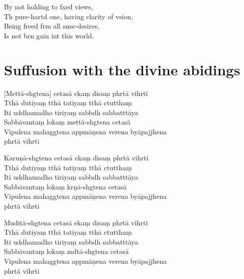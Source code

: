 By not holding to fxed views,\\
Th pure-hartd one, having clarity of vsion,\\
Being freed frm all snse-desires,\\
Is not brn gain int this world.

\clearpage

\chapter[Divine abidings]{Suffusion with the divine abidings}                                          %

\begin{leader}
\end{leader}

[Mettā-shgtena] cetasā ekaṃ disaṃ phrtā vihrti\\
Tthā dutiyaṃ tthā tatiyaṃ tthā ctutthaṃ\\
Iti uddhamadho tiriyaṃ sabbdh sabbatttāya\\
Sabbāvantaṃ lokaṃ mettā-shgtena cetasā\\
Vipulena mahaggtena appmāṇena verena byāpajjhena\\
\vin phrtā vihrti

Karuṇā-shgtena cetasā ekaṃ disaṃ phrtā vihrti\\
Tthā dutiyaṃ tthā tatiyaṃ tthā ctutthaṃ\\
Iti uddhamadho tiriyaṃ sabbdh sabbatttāya\\
Sabbāvantaṃ lokaṃ krṇā-shgtena cetasā\\
Vipulena mahaggtena appmāṇena verena byāpajjhena\\
\vin phrtā vihrti

Muditā-shgtena cetasā ekaṃ disaṃ phrtā vihrti\\
Tthā dutiyaṃ tthā tatiyaṃ tthā ctutthaṃ\\
Iti uddhamadho tiriyaṃ sabbdh sabbatttāya\\
Sabbāvantaṃ lokaṃ mdtā-shgtena cetasā\\
Vipulena mahaggtena appmāṇena verena byāpajjhena\\
\vin phrtā vihrti

